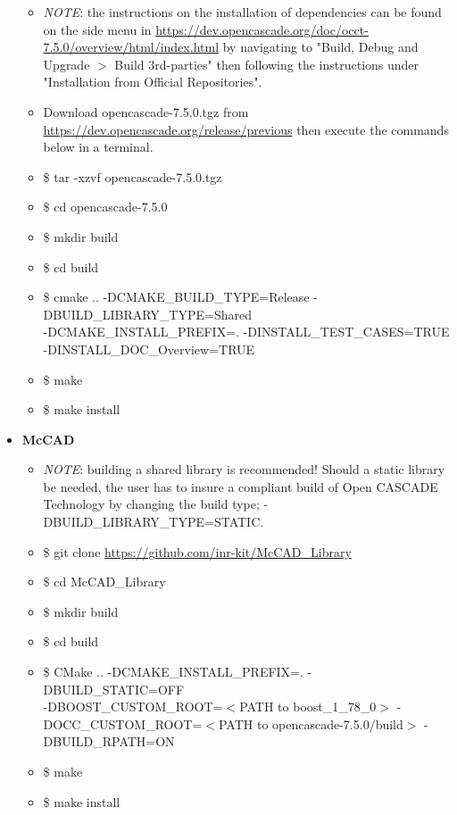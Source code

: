 \documentclass[letterpaper, 12 pt]{report}
\begin{document}
\begin{itemize}
\begin{itemize}
        \item \emph{NOTE}: the instructions on the installation of dependencies can be found on the side menu in \url{https://dev.opencascade.org/doc/occt-7.5.0/overview/html/index.html} by navigating to "Build, Debug and Upgrade $>$ Build 3rd-parties" then following the instructions under "Installation from Official Repositories".
    	\item Download opencascade-7.5.0.tgz from \url{https://dev.opencascade.org/release/previous} then execute the commands below in a terminal.
    	\item \$ tar -xzvf opencascade-7.5.0.tgz
    	\item \$ cd opencascade-7.5.0
    	\item \$ mkdir build
    	\item \$ cd build
    	\item \$ cmake .. -DCMAKE\_BUILD\_TYPE=Release -DBUILD\_LIBRARY\_TYPE=Shared \\ -DCMAKE\_INSTALL\_PREFIX=. -DINSTALL\_TEST\_CASES=TRUE \\ -DINSTALL\_DOC\_Overview=TRUE
    	\item \$ make
    	\item \$ make install
      \end{itemize}
	  \item \textbf{McCAD}
	  \begin{itemize}
		\item \emph{NOTE}: building a shared library is recommended! Should a static library be needed, the user has to insure a compliant build of Open CASCADE Technology by changing the build type; -DBUILD\_LIBRARY\_TYPE=STATIC.
		\item \$ git clone \url{https://github.com/inr-kit/McCAD_Library}
		\item \$ cd McCAD\_Library
		\item \$ mkdir build
		\item \$ cd build
		\item \$ CMake .. -DCMAKE\_INSTALL\_PREFIX=. -DBUILD\_STATIC=OFF \\ -DBOOST\_CUSTOM\_ROOT=$<$PATH to boost\_1\_78\_0$>$ -DOCC\_CUSTOM\_ROOT=$<$PATH to opencascade-7.5.0/build$>$ -DBUILD\_RPATH=ON
		\item \$ make
		\item \$ make install
	  \end{itemize}
    \end{itemize}
\end{document}
